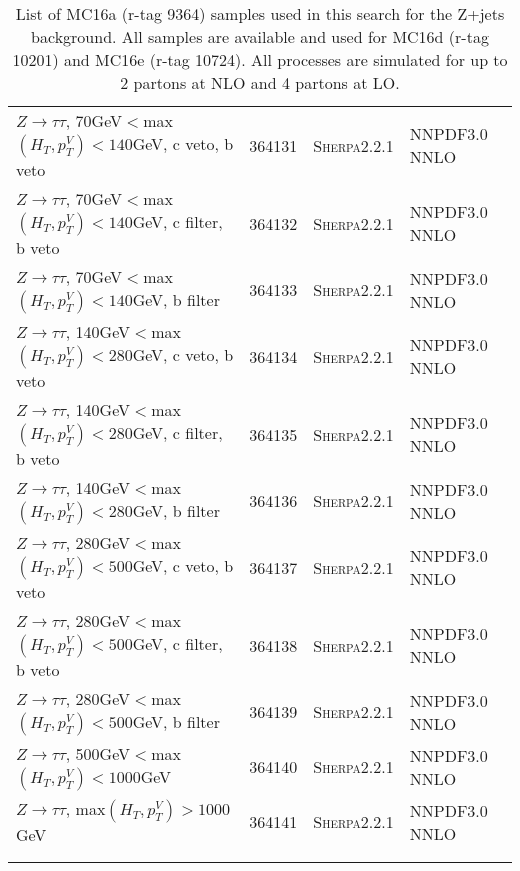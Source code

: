 \begin{table}[h!]
\begin{center}
{\begin{tabular}{@{} lcll @{}}
$Z\rightarrow \tau\tau$, 70GeV$<$max$(H_T,p_T^V)<140$GeV, c veto, b veto & 364131& \textsc{Sherpa2.2.1} &NNPDF3.0 NNLO \\
$Z\rightarrow \tau\tau$, 70GeV$<$max$(H_T,p_T^V)<140$GeV, c filter, b veto & 364132& \textsc{Sherpa2.2.1} &NNPDF3.0 NNLO \\
$Z\rightarrow \tau\tau$, 70GeV$<$max$(H_T,p_T^V)<140$GeV, b filter & 364133& \textsc{Sherpa2.2.1} &NNPDF3.0 NNLO \\
$Z\rightarrow \tau\tau$, 140GeV$<$max$(H_T,p_T^V)<280$GeV, c veto, b veto & 364134&  \textsc{Sherpa2.2.1} &NNPDF3.0 NNLO \\
$Z\rightarrow \tau\tau$, 140GeV$<$max$(H_T,p_T^V)<280$GeV, c filter, b veto & 364135& \textsc{Sherpa2.2.1} &NNPDF3.0 NNLO \\
$Z\rightarrow \tau\tau$, 140GeV$<$max$(H_T,p_T^V)<280$GeV, b filter & 364136& \textsc{Sherpa2.2.1} &NNPDF3.0 NNLO \\
$Z\rightarrow \tau\tau$, 280GeV$<$max$(H_T,p_T^V)<500$GeV, c veto, b veto & 364137& \textsc{Sherpa2.2.1} &NNPDF3.0 NNLO \\
$Z\rightarrow \tau\tau$, 280GeV$<$max$(H_T,p_T^V)<500$GeV, c filter, b veto & 364138& \textsc{Sherpa2.2.1} &NNPDF3.0 NNLO \\
$Z\rightarrow \tau\tau$, 280GeV$<$max$(H_T,p_T^V)<500$GeV, b filter &  364139& \textsc{Sherpa2.2.1} &NNPDF3.0 NNLO \\
$Z\rightarrow \tau\tau$, 500GeV$<$max$(H_T,p_T^V)<1000$GeV & 364140& \textsc{Sherpa2.2.1} &NNPDF3.0 NNLO \\
$Z\rightarrow \tau\tau$, max$(H_T,p_T^V)>1000$GeV&  364141&  	 \textsc{Sherpa2.2.1} &NNPDF3.0 NNLO \\	\\
 \hhline{====}
\end{tabular}
\caption{List of MC16a (r-tag  9364) samples used in this search for the Z+jets background.  All samples are available and used for MC16d (r-tag 10201) and MC16e (r-tag 10724). All processes are simulated for up to 2 partons at NLO and 4 partons at LO.}
\label{tab:MCSample4}
}
\end{center}
\end{table}

